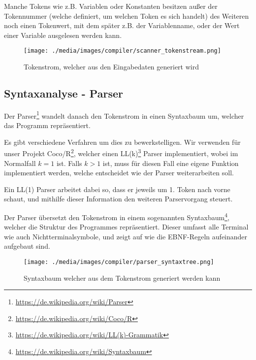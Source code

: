Manche Tokens wie z.B. Variablen oder Konstanten besitzen au\ss{}er der Tokennummer (welche definiert, um welchen Token es sich handelt) des Weiteren noch einen Tokenwert, mit dem sp\"ater z.B. der Variablenname, oder der Wert einer Variable ausgelesen werden kann.

\begin{figure}[h]
\centering
\texttt{[image: ./media/images/compiler/scanner\_tokenstream.png]}
\caption{Tokenstrom, welcher aus den Eingabedaten generiert wird}
\label{compiler_scanner_tokenstream}
\end{figure}

\subsection{Syntaxanalyse - Parser}
\label{compiler_parser}

Der Parser\footnote{\url{https://de.wikipedia.org/wiki/Parser}} wandelt danach den Tokenstrom in einen Syntaxbaum um, welcher das Programm repräsentiert.

Es gibt verschiedene Verfahren um dies zu bewerkstelligen. Wir verwenden f\"ur unser Projekt Coco/R\footnote{\url{https://de.wikipedia.org/wiki/Coco/R}}, welcher einen LL(k)\footnote{\url{https://de.wikipedia.org/wiki/LL(k)-Grammatik}} Parser implementiert, wobei im Normalfall $k = 1$ ist. Falls $k > 1$ ist, muss f\"ur diesen Fall eine eigene Funktion implementiert werden, welche entscheidet wie der Parser weiterarbeiten soll.

Ein LL(1) Parser arbeitet dabei so, dass er jeweils um 1. Token nach vorne schaut, und mithilfe dieser Information den weiteren Parservorgang steuert.


\newpage


Der Parser \"ubersetzt den Tokenstrom in einem sogenannten Syntaxbaum\footnote{\url{https://de.wikipedia.org/wiki/Syntaxbaum}}, welcher die Struktur des Programmes repr\"asentiert. Dieser umfasst alle Terminal wie auch Nichtterminalsymbole, und zeigt auf wie die EBNF-Regeln aufeinander aufgebaut sind.

\begin{figure}[h]
\centering
\texttt{[image: ./media/images/compiler/parser\_syntaxtree.png]}
\caption{Syntaxbaum welcher aus dem Tokenstrom generiert werden kann}
\label{compiler_parser_syntaxtree}
\end{figure}

